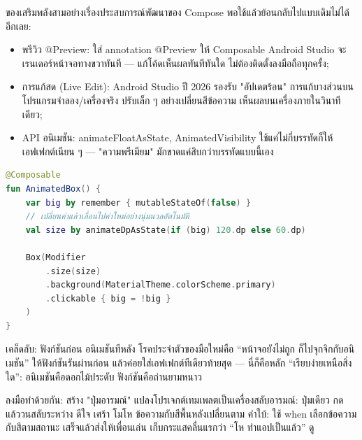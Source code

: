 
ของเสริมพลังสามอย่างเรื่องประสบการณ์พัฒนาของ Compose พอใช้แล้วย้อนกลับไปแบบเดิมไม่ได้อีกเลย:

\begin{itemize}
  \item พรีวิว @Preview: ใส่ annotation @Preview ให้ Composable Android Studio จะเรนเดอร์หน้าจอทางขวาทันที — แก้โค้ดเห็นผลทันทีทันใด ไม่ต้องติดตั้งลงมือถือทุกครั้ง;
  \item การแก้สด (Live Edit): Android Studio ปี 2026 รองรับ "อัปเดตร้อน" การแก้บางส่วนบนโปรแกรมจำลอง/เครื่องจริง ปรับเล็ก ๆ อย่างเปลี่ยนสีข้อความ เห็นผลบนเครื่องภายในวินาทีเดียว;
  \item API อนิเมชัน: animateFloatAsState, AnimatedVisibility ใช้แค่ไม่กี่บรรทัดก็ให้เอฟเฟกต์เนียน ๆ — "ความพรีเมียม" มักขาดแค่สิบกว่าบรรทัดแบบนี้เอง
\end{itemize}

\begin{lstlisting}[language=Kotlin]
@Composable
fun AnimatedBox() {
    var big by remember { mutableStateOf(false) }
    // เปลี่ยนค่าแล้วเลื่อนไปค่าใหม่อย่างนุ่มนวลอัตโนมัติ
    val size by animateDpAsState(if (big) 120.dp else 60.dp)

    Box(Modifier
        .size(size)
        .background(MaterialTheme.colorScheme.primary)
        .clickable { big = !big }
    )
}
\end{lstlisting}

\begin{tcbinfo}{เคล็ดลับ: ฟังก์ชันก่อน อนิเมชันทีหลัง}
โรคประจำตัวของมือใหม่คือ “หน้าจอยังไม่ถูก ก็ไปจุกจิกกับอนิเมชัน” ให้ฟังก์ชันรันผ่านก่อน แล้วค่อยใส่เอฟเฟกต์ทีเดียวท้ายสุด — นี่ก็คือหลัก “เรียบง่ายเหนือสิ่งใด”: อนิเมชันคือดอกไม้ประดับ ฟังก์ชันคือถ่านยามหนาว

\end{tcbinfo}

\begin{tcbpractice}{ลงมือทำด้วยกัน: สร้าง "ปุ่มอารมณ์"}
แปลงโปรเจกต์เทมเพลตเป็นเครื่องสลับอารมณ์: ปุ่มเดียว กดแล้ววนสลับระหว่าง ดีใจ เศร้า โมโห ข้อความกับสีพื้นหลังเปลี่ยนตาม คำใบ้: ใช้ when เลือกข้อความกับสีตามสถานะ เสร็จแล้วส่งให้เพื่อนเล่น เก็บกระแสคลื่นแรกว่า “โห ทำแอปเป็นแล้ว” ดู

\end{tcbpractice}

